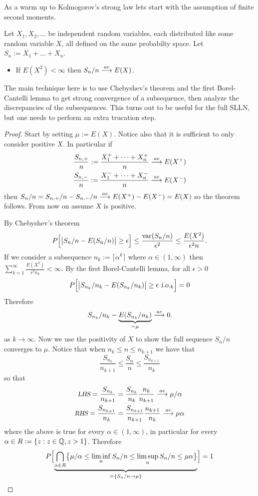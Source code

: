 As a warm up to Kolmogorov's strong law lets start with the assumption of finite second moments.
\begin{theorem}
\label{L2 SLLN}
Let $X_1, X_2,\ldots$ be independent random variables, each distributed like some random variable $X$, all defined on the same probabilty space. Let $S_n:= X_1+\ldots+ X_n$.
\begin{itemize}
\item If $E(X^2)<\infty$ then $S_n/n \overset{\small ae} \longrightarrow E(X)$.
\end{itemize}
\end{theorem}
The main technique here is to use Chebyshev's theorem and the first Borel-Cantelli lemma to get strong convergence of a subsequence, then analyze the discrepancies of the subsequences. This turns out to be useful for the full SLLN, but one needs to perform an extra trucation step.
\begin{proof}
Start by setting $\mu := E(X)$. Notice also that it is sufficient to only consider positive $X$. In particular if
\begin{align*}
\frac{S_{n,+}}{n}:= \frac{X_1^++ \cdots + X_n^+}{n} \overset{\small ae} \longrightarrow E(X^+) \\
\frac{S_{n,-}}{n}:= \frac{X_1^-+ \cdots + X_n^-}{n} \overset{\small ae} \longrightarrow E(X^-)
\end{align*}
then $S_n/n = S_{n,+}/n - S_{n,-}/n \overset{\small ae} \longrightarrow E(X^+) - E(X^-) = E(X)$ so the theorem follows. From now on assume $X$ is positive.

By Chebyshev's theorem
\begin{align*}
P\Bigl[\bigl| S_n/n - E(S_n/n)\bigr| \geq \epsilon \Bigr] \leq \frac{\text{var}(S_n/n)}{\epsilon^2}\leq \frac{E(X^2)}{\epsilon^2 n}.
\end{align*}
If we consider a subsequence $n_k:= \lceil \alpha^k \rceil$ where $\alpha \in (1,\infty)$ then $\sum_{k=1}^\infty \frac{E(X^2)}{\epsilon^2 n_k} < \infty$. By the first Borel-Cantelli lemma, for all $\epsilon>0$
\[  P\Bigl[\bigl| S_{n_k}/n_k - E(S_{n_k}/n_k)\bigr| \geq \epsilon {\,\,\text{\sl i.o.} }_k  \Bigr] =0 \]
Therefore
\[ S_{n_k}/n_k - \underbrace{E(S_{n_k}/n_k)}_{=\mu} \overset{\small ae} \longrightarrow 0. \]
as $k\rightarrow \infty$.
Now we use the positivity of $X$ to show the full sequence $S_n/n$ converges to $\mu$. Notice that when $n_k\leq n\leq n_{k+1}$ we have that
\begin{equation}
\label{lift from sub sequence}
\frac{S_{n_k}}{n_{k+1}}\leq \frac{S_n}{n} \leq \frac{S_{n_{k+1}}}{n_k}
\end{equation}
so that
\begin{align*}
\text{\sl \small LHS} = \frac{S_{n_k}}{n_{k+1}} & =  \frac{S_{n_k}}{n_{k}}\frac{n_k}{n_{k+1}} \overset{\small ae} \longrightarrow \mu/\alpha\\
\text{\sl \small RHS} = \frac{S_{n_{k+1}}}{n_k} & =  \frac{S_{n_{k+1}}}{n_{k+1}}\frac{n_{k+1}}{n_{k}} \overset{\small ae} \longrightarrow \mu\alpha
\end{align*}
where the above is true for every $\alpha\in (1,\infty)$, in particular for every $\alpha \in R:= \{z:z\in \Bbb Q, z>1\}$. Therefore
\[ P\Bigl[\underbrace{\bigcap_{\alpha \in R} \bigl\{ \mu/\alpha\leq \liminf_n  S_n/n  \leq \limsup_n S_n/n \leq \mu\alpha\bigr\}}_{=\{S_n/n \rightarrow \mu \}}\Bigr] = 1 \]
\end{proof}
